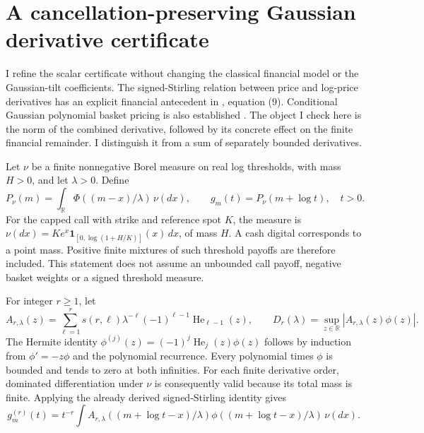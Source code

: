 \section{A cancellation-preserving Gaussian derivative certificate}
\label{sec:joint-gaussian-norm}

I refine the scalar certificate without changing the classical financial
model or the Gaussian-tilt coefficients. The signed-Stirling relation between
price and log-price derivatives has an explicit financial antecedent in
\citet{carr2001}, equation (9). Conditional Gaussian polynomial basket
pricing is also established \citep{olivaresalvarez2016}. The object I check
here is the norm of the combined derivative, followed by its concrete effect
on the finite financial remainder. I distinguish it from a sum of separately
bounded derivatives.

Let $\nu$ be a finite nonnegative Borel measure on real log thresholds, with
mass $H>0$, and let $\lambda>0$. Define
\[
 P_\nu(m)=\int_{\mathbb R}\Phi((m-x)/\lambda)\,\nu(dx),\qquad
 g_m(t)=P_\nu(m+\log t),\quad t>0.
\]
For the capped call with strike and reference spot $K$, the measure is
$\nu(dx)=K e^x\mathbf1_{[0,\log(1+H/K)]}(x)\,dx$, of mass $H$.
A cash digital corresponds to a point mass. Positive finite mixtures of
such threshold payoffs are therefore included. This statement does not
assume an unbounded call payoff, negative basket weights or a signed
threshold measure.

For integer $r\geq1$, let
\begin{equation}
 A_{r,\lambda}(z)=\sum_{\ell=1}^r s(r,\ell)\lambda^{-\ell}
              (-1)^{\ell-1}\operatorname{He}_{\ell-1}(z),\qquad
 D_r(\lambda)=\sup_{z\in\mathbb R}|A_{r,\lambda}(z)\phi(z)|.
 \label{eq:joint-gaussian-norm}
\end{equation}
The Hermite identity
$\phi^{(j)}(z)=(-1)^j\operatorname{He}_j(z)\phi(z)$ follows by induction
from $\phi'=-z\phi$ and the polynomial recurrence. Every polynomial times
$\phi$ is bounded and tends to zero at both infinities. For each finite
derivative order, dominated differentiation under $\nu$ is consequently
valid because its total mass is finite. Applying the already derived
signed-Stirling identity gives
\begin{equation}
 g_m^{(r)}(t)=t^{-r}\int A_{r,\lambda}((m+\log t-x)/\lambda)
                    \phi((m+\log t-x)/\lambda)\,\nu(dx).
 \label{eq:joint-gaussian-integral-derivative}
\end{equation}

